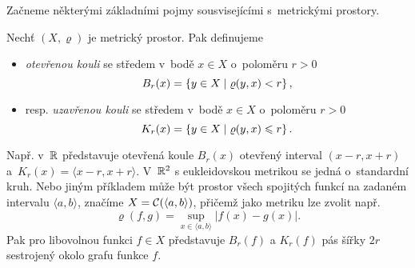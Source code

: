 Začneme některými základními pojmy sousvisejícími s~metrickými prostory.
\begin{definition}\label{def:koule-mp}
    Nechť $(X,\varrho)$ je metrický prostor. Pak definujeme
    \begin{itemize}
        \item \emph{otevřenou kouli} se středem v~bodě $x\in X$ o~poloměru $r>0$
        \[B_r(x)=\left\{y\in X\mid\varrho(y,x)<r\right\},\]
        \item resp. \emph{uzavřenou kouli} se středem v~bodě $x\in X$ o~poloměru $r>0$
        \[K_r(x)=\left\{y\in X\mid\varrho(y,x)\leqslant r\right\}.\]
    \end{itemize}
\end{definition}
Např. v~$\mathbb{R}$ představuje otevřená koule $B_r(x)$ otevřený interval $(x-r,x+r)$ a~$K_r(x)=\langle x-r,x+r\rangle$. V~$\mathbb{R}^2$ s eukleidovskou metrikou se jedná o~standardní kruh. Nebo jiným příkladem může být prostor všech spojitých funkcí na zadaném intervalu $\langle a,b\rangle$, značíme $X=\mathcal{C}(\langle a,b\rangle)$, přičemž jako metriku lze zvolit např.
\[\varrho(f,g)=\sup_{x\in\langle a,b\rangle}|f(x)-g(x)|.\]
Pak pro libovolnou funkci $f\in X$ představuje $B_r(f)$ a $K_r(f)$ pás šířky $2r$ sestrojený okolo grafu funkce $f$.

